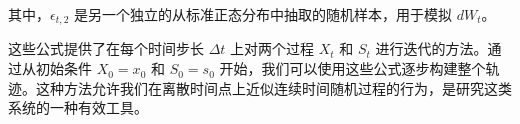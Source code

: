 \documentclass[12pt,a4paper]{article}
\begin{document}
   其中，\( \epsilon_{t,2} \) 是另一个独立的从标准正态分布中抽取的随机样本，用于模拟 \( dW_t \)。

这些公式提供了在每个时间步长 \( \Delta t \) 上对两个过程 \( X_t \) 和 \( S_t \) 进行迭代的方法。通过从初始条件 \( X_0 = x_0 \) 和 \( S_0 = s_0 \) 开始，我们可以使用这些公式逐步构建整个轨迹。这种方法允许我们在离散时间点上近似连续时间随机过程的行为，是研究这类系统的一种有效工具。
\begin{figure}[p]
    \centering
    \centering
    \centering
\end{figure}
\end{document}
